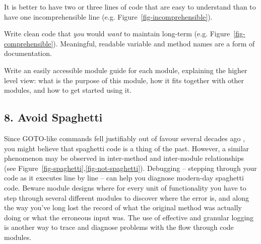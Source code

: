\documentclass{bmcart}
\begin{document}
It is better to have two or three lines of code that are easy to understand than to have one incomprehensible line (e.g. Figure~\ref{fig-incomprehensible}). 


Write clean code \cite{cleancode} that \textit{you} would \textit{want} to maintain long-term (e.g. Figure~\ref{fig-comprehensible}). Meaningful, readable variable and method names are a form of documentation. 


Write an easily accessible module guide for each module, explaining the higher level view: what is the purpose of this module, how it fits together with other modules, and how to get started using it. 

\subsection*{8. Avoid Spaghetti}

Since GOTO-like commands fell justifiably out of favour several decades ago \cite{dijkstra1968}, you might believe that spaghetti code is a thing of the past. However, a similar phenomenon may be observed in inter-method and inter-module relationships (see Figure~\ref{fig-spaghetti},\ref{fig-not-spaghetti}). Debugging -- stepping through your code as it executes line by line -- can help you diagnose modern-day spaghetti code. Beware module designs where for every unit of functionality you have to step through several different modules to discover where the error is, and along the way you've long lost the record of what the original method was actually doing or what the erroneous input was. The use of effective and granular logging is another way to trace and diagnose problems with the flow through code modules. 

\end{document}

